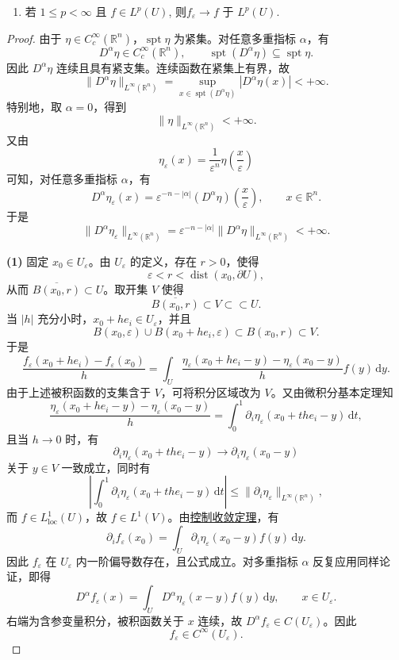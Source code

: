 \documentclass[../main.tex]{subfiles}
\begin{document}
\begin{theorem}[磨光子的性质]
\begin{enumerate}[(1)]
\item\label{theorem:appC-光滑算子的性质-5} 若 $1\leqslant p<\infty$ 且 $f\in L^p(U)$, 则$f_\varepsilon\to f$ 于 $L^p(U)$.
\end{enumerate}
\end{theorem}
\begin{proof}

由于 \(\eta\in C_c^\infty(\mathbb R^n)\)，\(\operatorname{spt}\eta\) 为紧集。对任意多重指标 \(\alpha\)，有
\[
D^\alpha\eta\in C_c^\infty(\mathbb R^n),
\qquad
\operatorname{spt}(D^\alpha\eta)\subseteq \operatorname{spt}\eta.
\]
因此 \(D^\alpha\eta\) 连续且具有紧支集。连续函数在紧集上有界，故
\[
\|D^\alpha\eta\|_{L^\infty(\mathbb R^n)}
=\sup_{x\in \operatorname{spt}(D^\alpha\eta)}|D^\alpha\eta(x)|
<+\infty.
\]
特别地，取 \(\alpha=0\)，得到
\[
\|\eta\|_{L^\infty(\mathbb R^n)}<+\infty.
\]
又由
\[
\eta_\varepsilon(x)=\frac1{\varepsilon^n}\eta\left(\frac{x}{\varepsilon}\right)
\]
可知，对任意多重指标 \(\alpha\)，有
\[
D^\alpha\eta_\varepsilon(x)
=\varepsilon^{-n-|\alpha|}(D^\alpha\eta)\left(\frac{x}{\varepsilon}\right),
\qquad x\in\mathbb R^n.
\]
于是
\[
\|D^\alpha\eta_\varepsilon\|_{L^\infty(\mathbb R^n)}
=\varepsilon^{-n-|\alpha|}\|D^\alpha\eta\|_{L^\infty(\mathbb R^n)}
<+\infty.
\]

\textbf{(1)}
固定 \(x_0\in U_\varepsilon\)。由 \(U_\varepsilon\) 的定义，存在 \(r>0\)，使得
\[
\varepsilon<r<\operatorname{dist}(x_0,\partial U),
\]
从而 \(\overline{B(x_0,r)}\subset U\)。取开集 \(V\) 使得
\[
\overline{B(x_0,r)}\subset V\subset\subset U.
\]
当 \(|h|\) 充分小时，\(x_0+h e_i\in U_\varepsilon\)，并且
\[
B(x_0,\varepsilon)\cup B(x_0+h e_i,\varepsilon)\subset B(x_0,r)\subset V.
\]
于是
\[
\frac{f_\varepsilon(x_0+h e_i)-f_\varepsilon(x_0)}{h}
=\int_U \frac{\eta_\varepsilon(x_0+h e_i-y)-\eta_\varepsilon(x_0-y)}{h}f(y)\,\mathrm dy.
\]
由于上述被积函数的支集含于 \(V\)，可将积分区域改为 \(V\)。又由微积分基本定理知
\[
\frac{\eta_\varepsilon(x_0+h e_i-y)-\eta_\varepsilon(x_0-y)}{h}
=\int_0^1 \partial_i\eta_\varepsilon(x_0+t h e_i-y)\,\mathrm dt,
\]
且当 \(h\to0\) 时，有
\[
\partial_i\eta_\varepsilon(x_0+t h e_i-y)\to \partial_i\eta_\varepsilon(x_0-y)
\]
关于 \(y\in V\) 一致成立，同时有
\[
\left|\int_0^1 \partial_i\eta_\varepsilon(x_0+t h e_i-y)\,\mathrm dt\right|
\leqslant \|\partial_i\eta_\varepsilon\|_{L^{\infty}\left( \mathbb{R} ^n \right) },
\]
而 \(f\in L^1_{\mathrm{loc}}(U)\)，故 \(f\in L^1(V)\)。由\hyperref[Real Analysis-theorem:控制收敛定理]{控制收敛定理}，有
\[
\partial_i f_\varepsilon(x_0)
=\int_U \partial_i\eta_\varepsilon(x_0-y)f(y)\,\mathrm dy.
\]
因此 \(f_\varepsilon\) 在 \(U_\varepsilon\) 内一阶偏导数存在，且公式成立。对多重指标 \(\alpha\) 反复应用同样论证，即得
\[
D^\alpha f_\varepsilon(x)
=\int_U D^\alpha\eta_\varepsilon(x-y)f(y)\,\mathrm dy,
\qquad x\in U_\varepsilon.
\]
右端为含参变量积分，被积函数关于 \(x\) 连续，故 \(D^\alpha f_\varepsilon\in C(U_\varepsilon)\)。因此
\[
f_\varepsilon\in C^\infty(U_\varepsilon).
\]


\end{proof}
\end{document}
